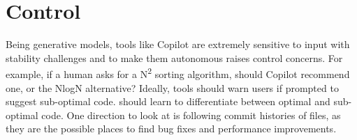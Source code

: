 \section{Control}
\label{control}
Being generative models, tools like Copilot are extremely sensitive to input with stability challenges and to make them autonomous raises control concerns.
For example, if a human asks for a N\textsuperscript{2} sorting algorithm, should Copilot recommend one, or the NlogN alternative? 
Ideally, tools should warn users if prompted to suggest sub-optimal code. 
\AISE{} should learn to differentiate between optimal and sub-optimal code. 
One direction to look at is following commit histories of files, as they are the possible places to find bug fixes and performance improvements.
